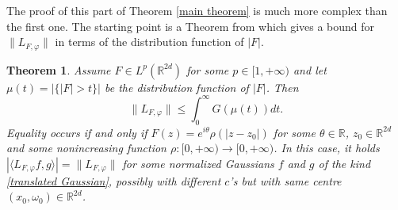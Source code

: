 \documentclass[corpo=11pt, stile=classica, tipotesi=custom,
greek, evenboxes, english]{toptesi}
\numberwithin{equation}{chapter}
\newtheorem{teo}{Theorem}[chapter] %
\theoremstyle{definition}
\theoremstyle{remark}
\newcommand{\R}{\mathbb{R}} %
\begin{document}
The proof of this part of Theorem \ref{main theorem} is much more complex than the first one. The starting point is a Theorem from \cite{nicolatilli_norm} which gives a bound for $\| L_{F, \varphi} \|$ in terms of the distribution function of $|F|$.
\begin{teo}\label{norm limitation}
	Assume $F \in L^p(\R^{2d})$ for some $p \in [1,+\infty)$ and let $\mu(t) = |\{|F|>t\}|$ be the distribution function of $|F|$. Then
	\begin{equation}\label{norm limitation formula}
		\| L_{F, \varphi} \| \leq \int_0^{\infty} G(\mu(t))dt.
	\end{equation}
	Equality occurs if and only if $F(z)=e^{i\theta}\rho(|z-z_0|)$ for some $\theta \in \R$, $z_0 \in \R^{2d}$ and some nonincreasing function $\rho : [0,+\infty) \rightarrow [0,+\infty)$. In this case, it holds $|\langle L_{F,\varphi}f,g \rangle| = \|L_{F,\varphi}\|$ for some normalized Gaussians $f$ and $g$ of the kind \eqref{translated Gaussian}, possibly with different $c$'s but with same centre $(x_0,\omega_0) \in \R^{2d}$.
\end{teo}
\end{document}
